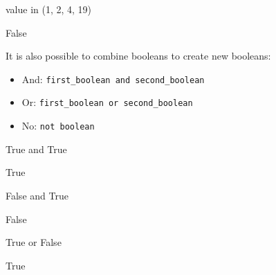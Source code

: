 \begin{pyin}
value in (1, 2, 4, 19)
\end{pyin}





\begin{raw}
False
\end{raw}





It is also possible to combine booleans to create new booleans:
\begin{itemize}
\item 

And: \texttt{first\_boolean and second\_boolean}

\item 

Or: \texttt{first\_boolean or second\_boolean}

\item 

No: \texttt{not boolean}

\end{itemize}




\begin{pyin}
True and True
\end{pyin}





\begin{raw}
True
\end{raw}







\begin{pyin}
False and True
\end{pyin}





\begin{raw}
False
\end{raw}







\begin{pyin}
True or False
\end{pyin}





\begin{raw}
True
\end{raw}







